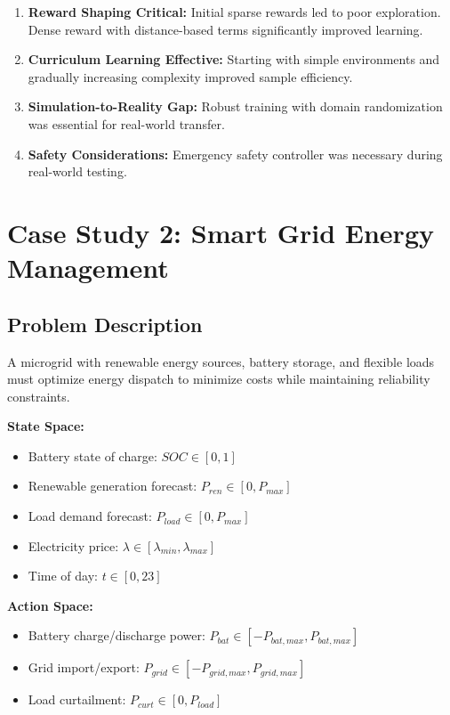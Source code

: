 \begin{enumerate}
    \item \textbf{Reward Shaping Critical:} Initial sparse rewards led to poor exploration. Dense reward with distance-based terms significantly improved learning.
    
    \item \textbf{Curriculum Learning Effective:} Starting with simple environments and gradually increasing complexity improved sample efficiency.
    
    \item \textbf{Simulation-to-Reality Gap:} Robust training with domain randomization was essential for real-world transfer.
    
    \item \textbf{Safety Considerations:} Emergency safety controller was necessary during real-world testing.
\end{enumerate}

\section{Case Study 2: Smart Grid Energy Management}

\subsection{Problem Description}

A microgrid with renewable energy sources, battery storage, and flexible loads must optimize energy dispatch to minimize costs while maintaining reliability constraints.

\textbf{State Space:}
\begin{itemize}
    \item Battery state of charge: $SOC \in [0, 1]$
    \item Renewable generation forecast: $P_{ren} \in [0, P_{max}]$
    \item Load demand forecast: $P_{load} \in [0, P_{max}]$
    \item Electricity price: $\lambda \in [\lambda_{min}, \lambda_{max}]$
    \item Time of day: $t \in [0, 23]$
\end{itemize}

\textbf{Action Space:}
\begin{itemize}
    \item Battery charge/discharge power: $P_{bat} \in [-P_{bat,max}, P_{bat,max}]$
    \item Grid import/export: $P_{grid} \in [-P_{grid,max}, P_{grid,max}]$
    \item Load curtailment: $P_{curt} \in [0, P_{load}]$
\end{itemize}

